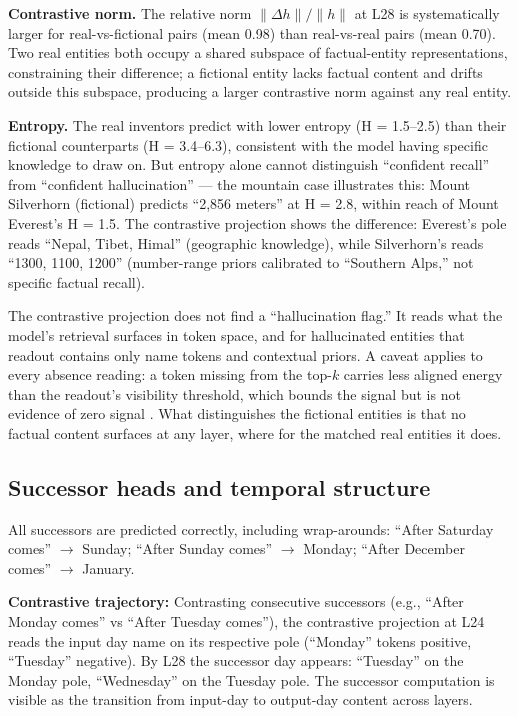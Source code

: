 \documentclass[11pt]{article}
\newcommand{\dhh}{\Delta h}
\begin{document}
\textbf{Contrastive norm.} The relative norm $\|\dhh\|/\|h\|$ at L28 is systematically
larger for real-vs-fictional pairs (mean 0.98) than real-vs-real pairs (mean
0.70). Two real entities both occupy a shared subspace of factual-entity
representations, constraining their difference; a fictional entity lacks
factual content and drifts outside this subspace, producing a larger
contrastive norm against any real entity.

\textbf{Entropy.} The real inventors predict with lower entropy
(H = 1.5--2.5) than their fictional counterparts (H = 3.4--6.3),
consistent with the model having specific
knowledge to draw on. But entropy alone cannot distinguish ``confident recall''
from ``confident hallucination'' --- the mountain case illustrates this: Mount
Silverhorn (fictional) predicts ``2,856 meters'' at H = 2.8, within
reach of Mount Everest's H = 1.5. The contrastive projection shows the difference:
Everest's pole reads ``Nepal, Tibet, Himal'' (geographic knowledge), while
Silverhorn's reads ``1300, 1100, 1200'' (number-range priors calibrated to
``Southern Alps,'' not specific factual recall).

The contrastive projection does not find a ``hallucination flag.'' It reads
what the model's retrieval surfaces in token space, and for hallucinated
entities that readout contains only name tokens and contextual priors.
A caveat applies to every absence reading: a token missing from the
top-$k$ carries less aligned energy than the readout's visibility
threshold, which bounds the signal but is not evidence of zero signal
\citep{tuomi2026visibility}. What distinguishes the fictional entities
is that no factual content surfaces at any layer, where for the matched
real entities it does.

\subsection{Successor heads and temporal structure}

All successors are predicted correctly, including wrap-arounds:
``After Saturday comes'' $\rightarrow$ Sunday; ``After Sunday comes'' $\rightarrow$ Monday;
``After December comes'' $\rightarrow$ January.

\textbf{Contrastive trajectory:} Contrasting consecutive successors (e.g., ``After
Monday comes'' vs ``After Tuesday comes''), the contrastive projection at L24
reads the input day name on its respective pole (``Monday'' tokens positive,
``Tuesday'' negative). By L28 the successor day appears: ``Tuesday'' on the
Monday pole, ``Wednesday'' on the Tuesday pole. The successor computation is
visible as the transition from input-day to output-day content across layers.
\end{document}

